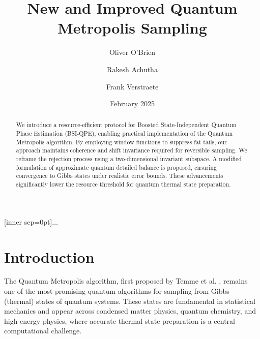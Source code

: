 \documentclass[aps,floatfix,10pt,amssymb,amsfont,amsmath,superscriptaddress,float,nofootinbib,longbibliography,nobalancelastpage,twocolumn]{revtex4-2}
\date{February 2025}
\begin{document}
[inner sep=0pt]{$\dots$}

\title{New and Improved Quantum Metropolis Sampling}
\author{Oliver O'Brien}
\author{Rakesh Achutha}
\author{Frank Verstraete}

\begin{abstract}
    We introduce a resource-efficient protocol for Boosted State-Independent Quantum Phase Estimation (BSI-QPE), enabling practical implementation of the Quantum Metropolis algorithm. By employing window functions to suppress fat tails, our approach maintains coherence and shift invariance required for reversible sampling. We reframe the rejection process using a two-dimensional invariant subspace. A modified formulation of approximate quantum detailed balance is proposed, ensuring convergence to Gibbs states under realistic error bounds. These advancements significantly lower the resource threshold for quantum thermal state preparation.
\end{abstract}

\maketitle

\section{Introduction}
The Quantum Metropolis algorithm, first proposed by Temme et al. \cite{Temme_2011}, remains one of the most promising quantum algorithms for sampling from Gibbs (thermal) states of quantum systems. These states are fundamental in statistical mechanics and appear across condensed matter physics, quantum chemistry, and high-energy physics, where accurate thermal state preparation is a central computational challenge. 
\end{document}
